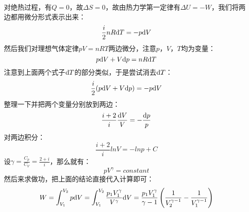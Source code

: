 \documentclass{Physics_H_Notes}
\begin{document}
        \begin{prove}
            对绝热过程，有$Q = 0$，故$\Delta S = 0$，故由热力学第一定律有$\Delta U = -W$，我们将两边都用微分形式表示出来：
            \begin{equation}
                \frac{i}{2}nR\mathrm{d}{T} = -p\mathrm{d}{V} 
                \nonumber
            \end{equation}
            然后我们对理想气体定律$pV = nRT$两边微分，注意$p$，$V$，$T$均为变量：
            \begin{equation}
                p\mathrm{d}{V} + V\mathrm{d}{p} = nR \mathrm{d}{T}
                \nonumber
            \end{equation}
            注意到上面两个式子$\mathrm{d}{T}$的部分类似，于是尝试消去$\mathrm{d}{T}$：
            \begin{equation}
                \frac{i}{2} (p\mathrm{d}{V} + V\mathrm{d}{p}) = -p\mathrm{d}{V}
                \nonumber
            \end{equation}
            整理一下并把两个变量分别放到两边：
            \begin{equation}
                \frac{i+2}{i} \frac{\mathrm{d}{V}}{V}  = -\frac{\mathrm{d}{p}}{p}
                \nonumber
            \end{equation}
            对两边积分：
            \begin{equation}
                \frac{i+2}{i} lnV  =-lnp + C
                \nonumber
            \end{equation}
            设$\gamma = \frac{C_p}{C_V} = \frac{2+i}{i}$，那么就有：
            \begin{equation}
                pV^{\gamma} = constant
            \end{equation}
            然后来求做功，把上面的结论直接代入计算即可：
            \begin{equation}
                W = \int_{V_1}^{V_2} p\mathrm{d}{V} =\int_{V_1}^{V_2} \frac{p_{1}V_{1}^{\gamma}}{V^{\gamma}}\mathrm{d}{V}
                  = \frac{p_{1}V_{1}^{\gamma}}{\gamma - 1}\left(\frac{1}{V_{2}^{\gamma-1}}-\frac{1}{V_1^{\gamma-1}}\right)
            \end{equation}
        \end{prove}
\end{document}
